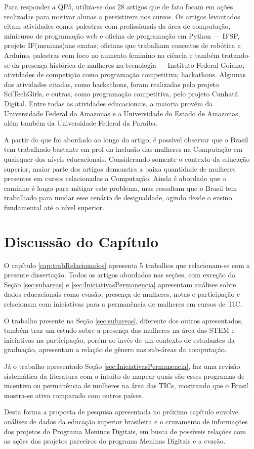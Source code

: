 Para responder a QP5,  utiliza-se dos 28 artigos que de fato focam em ações realizadas para motivar alunas a persistirem nos cursos. Os artigos levantados citam atividades como: palestras com profissionais da área de computação, minicurso de programação web e oficina de programação em Python — IFSP, projeto IF(meninas){nas exatas}; oficinas que trabalham conceitos de robótica e Arduíno, palestras com foco no aumento feminino na ciência e também tratando-se da presença histórica de mulheres na tecnologia — Instituto Federal Goiano; atividades de competição como programação competitiva; hackathons. Algumas das atividades citadas, como hackathons, foram realizadas pelo projeto SciTechGirls, e outras, como programação competitiva, pelo projeto Cunhatã Digital. Entre todas as atividades educacionais, a maioria provém da Universidade Federal do Amazonas e a Universidade do Estado de Amazonas, além também da Universidade Federal da Paraíba.

A partir do que foi abordado ao longo do artigo, é possível observar que o Brasil tem trabalhado bastante em prol da inclusão das mulheres na Computação em quaisquer dos níveis educacionais. Considerando somente o contexto da educação superior, maior parte dos artigos demonstra a baixa quantidade de mulheres presentes em cursos relacionadas a Computação. Ainda é abordado que o caminho é longo para mitigar este problema, mas ressaltam que o Brasil tem trabalhado para mudar esse cenário de desigualdade, agindo desde o ensino fundamental até o nível superior.



\section{Discussão do Capítulo}\label{sec:DiscussaoTrabRel}

O capítulo \ref{cap:trabRelacionados} apresenta 5 trabalhos que relacionam-se com a presente dissertação. Todos os artigos abordados nas seções, com exceção da Seção \ref{sec:subareas} e \ref{sec:IniciativasPermanencia} apresentam análises sobre dados educacionais como evasão, presença de mulheres, notas e participação e relacionam com iniciativas para a permanência de mulheres em cursos de TIC. 

O trabalho presente na Seção \ref{sec:subareas}, diferente dos outros apresentados, também traz um estudo sobre a presença das mulheres na área das STEM e iniciativas na participação, porém ao invés de um contexto de estudantes da graduação, apresentam a relação de gênero nas sub-áreas da computação.

Já o trabalho apresentado Seção \ref{sec:IniciativasPermanencia}, faz uma revisão sistemática da literatura com o intuito de mapear quais são esses programas de incentivo ou permanência de mulheres na área das TICs, mostrando que o Brasil mostra-se ativo comparado com outros países.

Desta forma a proposta de pesquisa apresentada no próximo capítulo envolve análises de dados da educação superior brasileira e o cruzamento de informações dos projetos do Programa Meninas Digitais, em busca de possíveis relações com as ações dos projetos
parceiros do programa Meninas Digitais e a evasão.